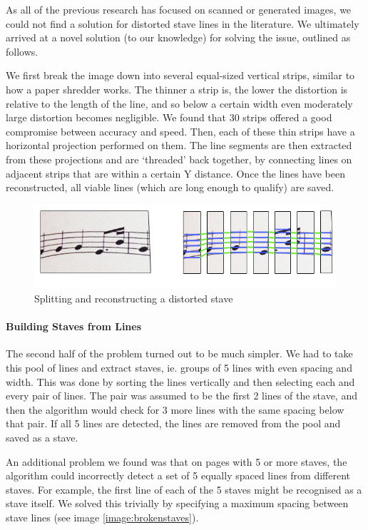 As all of the previous research has focused on scanned or generated images, we could not find a solution for distorted stave lines in the literature. We ultimately arrived at a novel solution (to our knowledge) for solving the issue, outlined as follows.

We first break the image down into several equal-sized vertical strips, similar to how a paper shredder works. The thinner a strip is, the lower the distortion is relative to the length of the line, and so below a certain width even moderately large distortion becomes negligible. We found that 30 strips offered a good compromise between accuracy and speed. Then, each of these thin strips have a horizontal projection performed on them. The line segments are
then extracted from these projections and are ‘threaded’ back together, by connecting lines on adjacent strips that are within a certain Y distance. Once the lines have been reconstructed, all viable lines (which are long enough to qualify) are saved.

\begin{figure}[h!]
    \centering
    \includegraphics[width=120mm]{./assets/building_lines.png}
    \caption{Splitting and reconstructing a distorted stave}
    \label{image:linesjoining}
\end{figure}

\paragraph{Building Staves from Lines}

The second half of the problem turned out to be much simpler. We had to take this pool of lines and extract staves, ie. groups of 5 lines with even spacing and width. This was done by sorting the lines vertically and then selecting each and every pair of lines. The pair was assumed to be the first 2 lines of the stave, and then the algorithm would check for 3 more lines with the same spacing below that pair. If all 5 lines are detected, the lines
are removed from the pool and saved as a stave.

An additional problem we found was that on pages with 5 or more staves, the algorithm could incorrectly detect a set of 5 equally spaced lines from different staves. For example, the first line of each of the 5 staves might be recognised as a stave itself. We solved this trivially by specifying a maximum spacing between stave lines (see image \ref{image:brokenstaves}).

